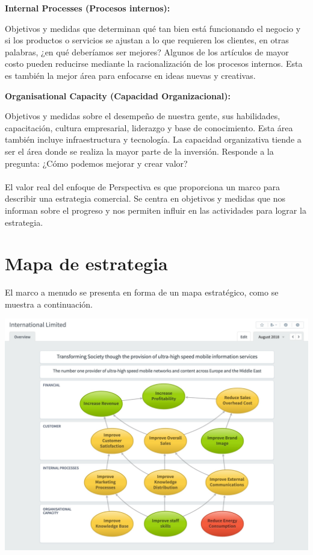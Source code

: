 \item \textbf{Internal Processes (Procesos internos):}
\item{Objetivos y medidas que determinan qué tan bien está funcionando el negocio y si los productos o servicios se ajustan a lo que requieren los clientes, en otras palabras, ¿en qué deberíamos ser mejores? Algunos de los artículos de mayor costo pueden reducirse mediante la racionalización de los procesos internos. Esta es también la mejor área para enfocarse en ideas nuevas y creativas.}
\textbf{}
\\
\item \textbf{Organisational Capacity (Capacidad Organizacional):}
\item{Objetivos y medidas sobre el desempeño de nuestra gente, sus habilidades, capacitación, cultura empresarial, liderazgo y base de conocimiento. Esta área también incluye infraestructura y tecnología. La capacidad organizativa tiende a ser el área donde se realiza la mayor parte de la inversión. Responde a la pregunta: ¿Cómo podemos mejorar y crear valor?
\\
\textbf{}
\\
El valor real del enfoque de Perspectiva es que proporciona un marco para describir una estrategia comercial. Se centra en objetivos y medidas que nos informan sobre el progreso y nos permiten influir en las actividades para lograr la estrategia.}

\section*{Mapa de estrategia}

\item{El marco a menudo se presenta en forma de un mapa estratégico, como se muestra a continuación.}

\begin{center}
\includegraphics[width=15cm]{./Imagenes/img11}
\end{center}


